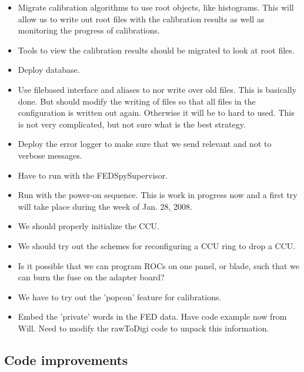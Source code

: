 \begin{itemize}
\item Migrate calibration algorithms to use root objects, like
      histograms. This will allow us to write out root files
      with the calibration results as well as monitoring
      the progress of calibrations.
\item Tools to view the calibration results should be 
      migrated to look at root files.
\item Deploy database. 
\item Use filebased interface and aliases to nor write over 
      old files. This is basically done. But should modify the
      writing of files so that all files in the configuration
      is written out again. Otherwise it will be to hard to used.
      This is not very complicated, but not sure what is the 
      best strategy.
\item Deploy the error logger to make sure that we send relevant
      and not to verbose messages.
\item Have to run with the FEDSpySupervisor.
\item Run with the power-on sequence. This is work in progress
      now and a first try will take place during the week of 
      Jan. 28, 2008.
\item We should properly initialize the CCU. 
\item We should try out the schemes for reconfiguring a CCU ring
      to drop a CCU.
\item Is it possible that we can program ROCs on one panel, or blade,
      such that we can burn the fuse on the adapter board?
\item We have to try out the 'popcon' feature for calibrations.
\item Embed the 'private' words in the FED data. Have code example
      now from Will. Need to modify the rawToDigi code to unpack
      this information.
\end{itemize}

\subsection{Code improvements}

